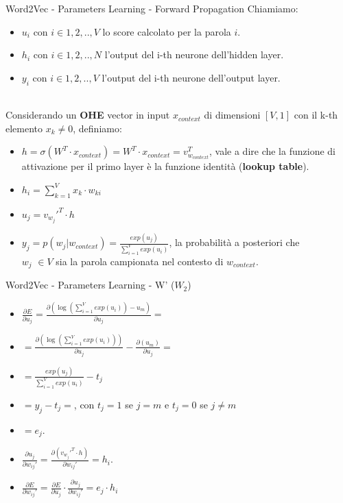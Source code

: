 \documentclass[british]{beamer}
\begin{document}
\begin{frame}{Word2Vec - Parameters Learning - Forward Propagation}
	Chiamiamo:
	\begin{itemize}
		\item \(u_i\) con \(i \in {1,2,..,V}\) lo score calcolato per la parola \(i\).
		\item \(h_i\) con \(i \in {1,2,..,N}\) l'output del i-th neurone dell'hidden layer.
		\item \(y_i\) con \(i \in {1,2,..,V}\) l'output del i-th neurone dell'output layer.
		\\~\\
	\end{itemize} 
	Considerando un \textbf{OHE} vector in input \(x_{context}\) di dimensioni \([V,1]\) con il k-th elemento \(x_k \neq 0\), definiamo:
	\begin{itemize}
		\item \(h = \sigma(W^T \cdot x_{context}) = W^T \cdot x_{context} = v_{w_{context}}^T\), vale a dire che la funzione di attivazione per il primo layer \`{e} la funzione identit\`{a} (\textbf{lookup table}).
		\item \(h_i = \sum_{k=1}^{V} x_k \cdot w_{ki}\)
		\item \(u_j = v_{w_j}'^T \cdot h\)
		\item \( y_{j} = p(w_{j}|w_{context}) =  \frac{exp(u_{j})}{\sum_{i=1}^{V} exp(u_i)}\), la probabilit\`{a} a posteriori che\\ \(w_{j}\) \(\in V\) sia la parola campionata nel contesto di \(w_{context}\).
	\end{itemize}
\end{frame}

\begin{frame}{Word2Vec - Parameters Learning - W' (\(W_2\))}
	\begin{itemize}
		\item \( \frac{\partial E}{\partial u_j} = \frac{\partial \left( \log \left( \sum_{i=1}^{V} exp(u_i) \right) - u_m\right)}{\partial u_j} = \)
		\item \( = \frac{\partial \left(\log \left( \sum_{i=1}^{V} exp(u_i) \right)\right)}{\partial u_j} - \frac{\partial \left( u_m\right)}{\partial u_j}=\)
		\item \( = \frac{exp(u_j)}{\sum_{i=1}^{V} exp(u_i)} - t_j \)
		\item \( = y_j -t_j = \), con \(t_j = 1\) se \(j=m\) e \(t_j = 0\) se \(j\neq m\)
		\item \( = e_j.\)
		\item \(\frac{\partial u_j}{\partial w_{ij}'} = \frac{\partial \left( v_{w_j}'^T \cdot h\right)}{\partial w_{ij}'} = h_i\).
		\item  \( \frac{\partial E}{\partial w_{ij}'} = \frac{\partial E}{\partial u_j} \cdot \frac{\partial u_j}{\partial w_{ij}'} = e_j \cdot h_i\)
	\end{itemize}
\end{frame}
\end{document}
